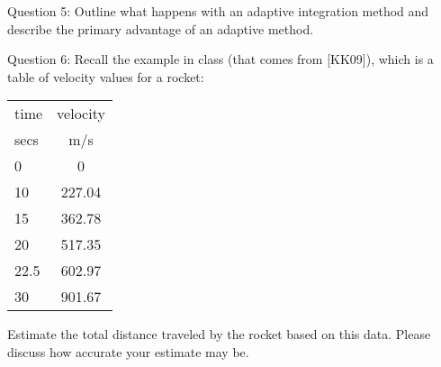 \documentclass{article}
\renewcommand{\cite}[1]{[#1]}
\begin{document}
Question 5: Outline what happens with an adaptive integration method and describe the primary advantage of an adaptive method. 
\medskip \par \noindent
Question 6:  Recall the example in class (that comes from \cite{KK09}), which is a table of velocity values for a rocket:
\begin{tabular}{|l|c|}
\hline
time & velocity\\

secs & m/s\\
\hline
0 & 0 \\
\hline
10 & 227.04 \\
\hline
15 & 362.78 \\
\hline
20 & 517.35 \\
\hline
22.5 & 602.97 \\
\hline
30 & 901.67\\
\hline
\end{tabular}

Estimate the total distance traveled by the rocket based on this data. Please discuss how accurate your estimate may be. 
\end{document}
